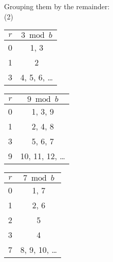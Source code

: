 \vfill
\newpage

\noindent
Grouping them by the remainder:\\
(2)
\begin{minipage}{0.32\textwidth}
    \centering
    \begin{tabular}{c|c}
        $r$ & $3 \bmod b$    \\
        \hline
        0   & 1, 3           \\
        1   & 2              \\
        3   & 4, 5, 6, \dots \\
    \end{tabular}
\end{minipage}%
\begin{minipage}{0.32\textwidth}
    \centering
    \begin{tabular}{c|c}
        $r$ & $9 \bmod b$       \\
        \hline
        0   & 1, 3, 9           \\
        1   & 2, 4, 8           \\
        3   & 5, 6, 7           \\
        9   & 10, 11, 12, \dots \\
    \end{tabular}
\end{minipage}%
\begin{minipage}{0.32\textwidth}
    \centering
    \begin{tabular}{c|c}
        $r$ & $7 \bmod b$     \\
        \hline
        0   & 1, 7            \\
        1   & 2, 6            \\
        2   & 5               \\
        3   & 4               \\
        7   & 8, 9, 10, \dots \\
    \end{tabular}
\end{minipage}


